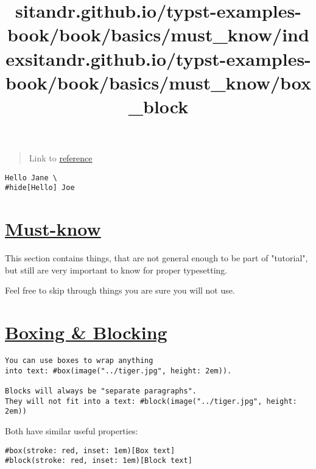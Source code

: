 \begin{quote}
Link to \href{https://typst.app/docs/reference/layout/hide/}{reference}
\end{quote}

\begin{verbatim}
Hello Jane \
#hide[Hello] Joe
\end{verbatim}

\pandocbounded{}


\title{sitandr.github.io/typst-examples-book/book/basics/must_know/index}

\section{\texorpdfstring{\hyperref[must-know]{Must-know}}{Must-know}}\label{must-know}

This section contains things, that are not general enough to be part of
"tutorial", but still are very important to know for proper typesetting.

Feel free to skip through things you are sure you will not use.


\title{sitandr.github.io/typst-examples-book/book/basics/must_know/box_block}

\section{\texorpdfstring{\hyperref[boxing--blocking]{Boxing \&
Blocking}}{Boxing \& Blocking}}\label{boxing--blocking}

\begin{verbatim}
You can use boxes to wrap anything
into text: #box(image("../tiger.jpg", height: 2em)).

Blocks will always be "separate paragraphs".
They will not fit into a text: #block(image("../tiger.jpg", height: 2em))
\end{verbatim}

\pandocbounded{}

Both have similar useful properties:

\begin{verbatim}
#box(stroke: red, inset: 1em)[Box text]
#block(stroke: red, inset: 1em)[Block text]
\end{verbatim}

\pandocbounded{}

